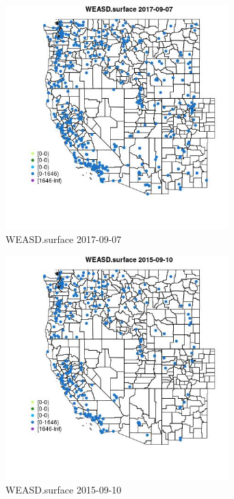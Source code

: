 \begin{figure} 
\centering  
\includegraphics[width=0.77\textwidth]{Code_Outputs/Report_ML_input_PM25_Step4_part_e_de_duplicated_aves_compiled_2019-05-21wNAs_MapObsWEASDsurface2017-09-07.jpg} 
\caption{\label{fig:Report_ML_input_PM25_Step4_part_e_de_duplicated_aves_compiled_2019-05-21wNAsMapObsWEASDsurface2017-09-07}WEASD.surface 2017-09-07} 
\end{figure} 
 

\begin{figure} 
\centering  
\includegraphics[width=0.77\textwidth]{Code_Outputs/Report_ML_input_PM25_Step4_part_e_de_duplicated_aves_compiled_2019-05-21wNAs_MapObsWEASDsurface2015-09-10.jpg} 
\caption{\label{fig:Report_ML_input_PM25_Step4_part_e_de_duplicated_aves_compiled_2019-05-21wNAsMapObsWEASDsurface2015-09-10}WEASD.surface 2015-09-10} 
\end{figure} 
 

